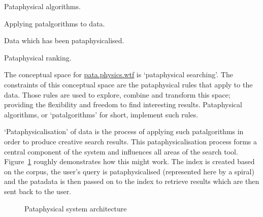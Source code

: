 \begin{description}[leftmargin=4.5cm]
  \item [Patalgorithms] Pataphysical algorithms.
  \item [Pataphysicalisation] Applying patalgorithms to data.
  \item [Patadata] Data which has been pataphysicalised.
  \item [Pranking] Pataphysical ranking.
\end{description}

The conceptual space for \url{pata.physics.wtf} is `pataphysical searching'. The constraints of this conceptual space are the pataphysical rules that apply to the data. Those rules are used to explore, combine and transform this space; providing the flexibility and freedom to find interesting results. Pataphysical algorithms, or `patalgorithms' for short, implement such rules.

`Pataphysicalisation' of data is the process of applying such patalgorithms in order to produce creative search results. This pataphysicalisation process forms a central component of the system and influences all areas of the search tool. Figure~\ref{fig:patarc} roughly demonstrates how this might work. The index is created based on the corpus, the user's query is pataphysicalised (represented here by a spiral) and the patadata is then passed on to the index to retrieve results which are then sent back to the user.

\begin{figure}[!htbp]
  \centering
  \caption[Pataphysical system architecture]{Pataphysical system architecture}
  \label{fig:patarc}
\end{figure}

